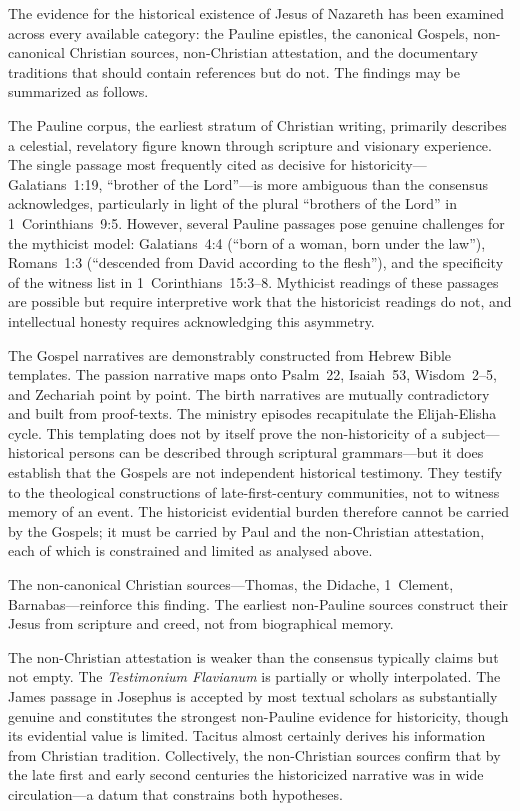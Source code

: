 \documentclass[12pt,oneside]{article}
\begin{document}
The evidence for the historical existence of Jesus of Nazareth has been
examined across every available category: the Pauline epistles, the
canonical Gospels, non-canonical Christian sources, non-Christian
attestation, and the documentary traditions that should contain
references but do not.  The findings may be summarized as follows.

The Pauline corpus, the earliest stratum of Christian writing, primarily
describes a celestial, revelatory figure known through scripture and
visionary experience.  The single passage most frequently cited as
decisive for historicity---Galatians~1:19, ``brother of the Lord''---is
more ambiguous than the consensus acknowledges, particularly in light of
the plural ``brothers of the Lord'' in 1~Corinthians~9:5.  However,
several Pauline passages pose genuine challenges for the mythicist
model: Galatians~4:4 (``born of a woman, born under the law''),
Romans~1:3 (``descended from David according to the flesh''), and the
specificity of the witness list in 1~Corinthians~15:3--8.  Mythicist
readings of these passages are possible but require interpretive work
that the historicist readings do not, and intellectual honesty requires
acknowledging this asymmetry.

The Gospel narratives are demonstrably constructed from Hebrew Bible
templates.  The passion narrative maps onto Psalm~22, Isaiah~53,
Wisdom~2--5, and Zechariah point by point.  The birth narratives are
mutually contradictory and built from proof-texts.  The ministry
episodes recapitulate the Elijah-Elisha cycle.  This templating does
not by itself prove the non-historicity of a subject---historical
persons can be described through scriptural grammars---but it does
establish that the Gospels are not independent historical testimony.
They testify to the theological constructions of late-first-century
communities, not to witness memory of an event.  The historicist
evidential burden therefore cannot be carried by the Gospels; it must
be carried by Paul and the non-Christian attestation, each of which
is constrained and limited as analysed above.

The non-canonical Christian sources---Thomas, the Didache, 1~Clement,
Barnabas---reinforce this finding.  The earliest non-Pauline sources
construct their Jesus from scripture and creed, not from biographical
memory.

The non-Christian attestation is weaker than the consensus typically
claims but not empty.  The \textit{Testimonium Flavianum} is partially
or wholly interpolated.  The James passage in Josephus is accepted by
most textual scholars as substantially genuine and constitutes the
strongest non-Pauline evidence for historicity, though its evidential
value is limited.  Tacitus almost certainly derives his information from
Christian tradition.  Collectively, the non-Christian sources confirm
that by the late first and early second centuries the historicized
narrative was in wide circulation---a datum that constrains both
hypotheses.
\end{document}
